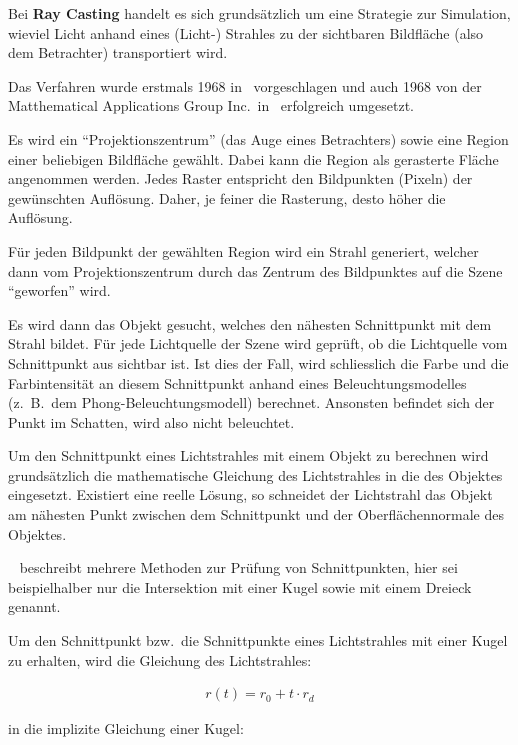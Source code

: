 Bei \textbf{Ray Casting} handelt es sich grundsätzlich um eine Strategie zur
Simulation, wieviel Licht anhand eines (Licht-) Strahles zu der sichtbaren
Bildfläche (also dem Betrachter) transportiert wird.

Das Verfahren wurde erstmals 1968 in~\cite{appel_techniques_1968} vorgeschlagen
und auch 1968 von der Matthematical Applications Group Inc.\
in~\cite{arlington_mathematical_applications_group_inc_afips_1968} erfolgreich umgesetzt.

Es wird ein ``Projektionszentrum'' (das Auge eines Betrachters) sowie
eine Region einer beliebigen Bildfläche gewählt. Dabei kann die Region
als gerasterte Fläche angenommen werden. Jedes Raster entspricht den
Bildpunkten (Pixeln) der gewünschten Auflösung.  Daher, je feiner die
Rasterung, desto höher die Auflösung.

Für jeden Bildpunkt der gewählten Region wird ein Strahl
generiert, welcher dann vom Projektionszentrum durch das Zentrum des
Bildpunktes auf die Szene ``geworfen'' wird. 

Es wird dann das Objekt gesucht, welches den nähesten Schnittpunkt mit
dem Strahl bildet. Für jede Lichtquelle der Szene wird geprüft, ob die
Lichtquelle vom Schnittpunkt aus sichtbar ist. Ist dies der Fall, wird
schliesslich die Farbe und die Farbintensität an diesem Schnittpunkt
anhand eines Beleuchtungsmodelles (z.\ B.\ dem Phong-Beleuchtungsmodell)
berechnet. Ansonsten befindet sich der Punkt im Schatten, wird also
nicht beleuchtet.

Um den Schnittpunkt eines Lichtstrahles mit einem Objekt zu berechnen
wird grundsätzlich die mathematische Gleichung des Lichtstrahles in die
des Objektes eingesetzt. Existiert eine reelle Lösung, so schneidet der
Lichtstrahl das Objekt am nähesten Punkt zwischen dem Schnittpunkt und
der Oberflächennormale des Objektes.

~\citeauthor{glassner_introduction_1989} beschreibt mehrere Methoden zur
Prüfung von Schnittpunkten, hier sei beispielhalber nur die Intersektion
mit einer Kugel sowie mit einem Dreieck genannt.

Um den Schnittpunkt bzw.\ die Schnittpunkte eines Lichtstrahles mit
einer Kugel zu erhalten, wird die Gleichung des Lichtstrahles:

\begin{gather}
    r(t) = r_{0} + t \cdot r_{d}
\end{gather}

in die implizite Gleichung einer Kugel:

